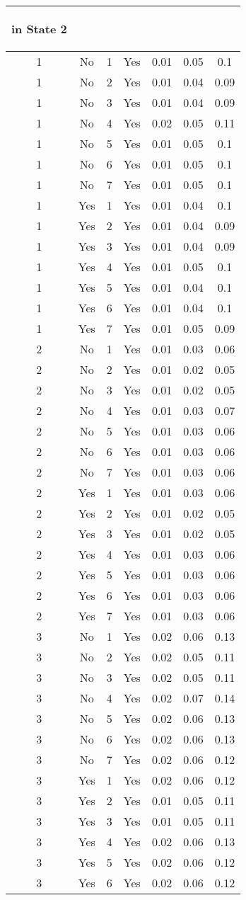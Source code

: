 \begin{table}
\begin{tabular}{|c|c|c|c|c|c|c|}
\begin{cellvarwidth}[t]
in State 2
\end{cellvarwidth}\tabularnewline
\hline 
\hline 
1 & No & 1 & Yes & 0.01 & 0.05 & 0.1\tabularnewline
\hline 
1 & No & 2 & Yes & 0.01 & 0.04 & 0.09\tabularnewline
\hline 
1 & No & 3 & Yes & 0.01 & 0.04 & 0.09\tabularnewline
\hline 
1 & No & 4 & Yes & 0.02 & 0.05 & 0.11\tabularnewline
\hline 
1 & No & 5 & Yes & 0.01 & 0.05 & 0.1\tabularnewline
\hline 
1 & No & 6 & Yes & 0.01 & 0.05 & 0.1\tabularnewline
\hline 
1 & No & 7 & Yes & 0.01 & 0.05 & 0.1\tabularnewline
\hline 
1 & Yes & 1 & Yes & 0.01 & 0.04 & 0.1\tabularnewline
\hline 
1 & Yes & 2 & Yes & 0.01 & 0.04 & 0.09\tabularnewline
\hline 
1 & Yes & 3 & Yes & 0.01 & 0.04 & 0.09\tabularnewline
\hline 
1 & Yes & 4 & Yes & 0.01 & 0.05 & 0.1\tabularnewline
\hline 
1 & Yes & 5 & Yes & 0.01 & 0.04 & 0.1\tabularnewline
\hline 
1 & Yes & 6 & Yes & 0.01 & 0.04 & 0.1\tabularnewline
\hline 
1 & Yes & 7 & Yes & 0.01 & 0.05 & 0.09\tabularnewline
\hline 
2 & No & 1 & Yes & 0.01 & 0.03 & 0.06\tabularnewline
\hline 
2 & No & 2 & Yes & 0.01 & 0.02 & 0.05\tabularnewline
\hline 
2 & No & 3 & Yes & 0.01 & 0.02 & 0.05\tabularnewline
\hline 
2 & No & 4 & Yes & 0.01 & 0.03 & 0.07\tabularnewline
\hline 
2 & No & 5 & Yes & 0.01 & 0.03 & 0.06\tabularnewline
\hline 
2 & No & 6 & Yes & 0.01 & 0.03 & 0.06\tabularnewline
\hline 
2 & No & 7 & Yes & 0.01 & 0.03 & 0.06\tabularnewline
\hline 
2 & Yes & 1 & Yes & 0.01 & 0.03 & 0.06\tabularnewline
\hline 
2 & Yes & 2 & Yes & 0.01 & 0.02 & 0.05\tabularnewline
\hline 
2 & Yes & 3 & Yes & 0.01 & 0.02 & 0.05\tabularnewline
\hline 
2 & Yes & 4 & Yes & 0.01 & 0.03 & 0.06\tabularnewline
\hline 
2 & Yes & 5 & Yes & 0.01 & 0.03 & 0.06\tabularnewline
\hline 
2 & Yes & 6 & Yes & 0.01 & 0.03 & 0.06\tabularnewline
\hline 
2 & Yes & 7 & Yes & 0.01 & 0.03 & 0.06\tabularnewline
\hline 
3 & No & 1 & Yes & 0.02 & 0.06 & 0.13\tabularnewline
\hline 
3 & No & 2 & Yes & 0.02 & 0.05 & 0.11\tabularnewline
\hline 
3 & No & 3 & Yes & 0.02 & 0.05 & 0.11\tabularnewline
\hline 
3 & No & 4 & Yes & 0.02 & 0.07 & 0.14\tabularnewline
\hline 
3 & No & 5 & Yes & 0.02 & 0.06 & 0.13\tabularnewline
\hline 
3 & No & 6 & Yes & 0.02 & 0.06 & 0.13\tabularnewline
\hline 
3 & No & 7 & Yes & 0.02 & 0.06 & 0.12\tabularnewline
\hline 
3 & Yes & 1 & Yes & 0.02 & 0.06 & 0.12\tabularnewline
\hline 
3 & Yes & 2 & Yes & 0.01 & 0.05 & 0.11\tabularnewline
\hline 
3 & Yes & 3 & Yes & 0.01 & 0.05 & 0.11\tabularnewline
\hline 
3 & Yes & 4 & Yes & 0.02 & 0.06 & 0.13\tabularnewline
\hline 
3 & Yes & 5 & Yes & 0.02 & 0.06 & 0.12\tabularnewline
\hline 
3 & Yes & 6 & Yes & 0.02 & 0.06 & 0.12\tabularnewline

\end{tabular}
\end{table}
